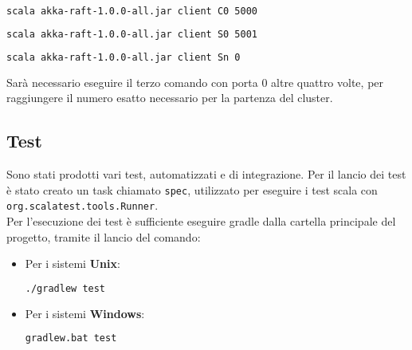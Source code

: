 			  
			  	\begin{lstlisting}[language=bash]
scala akka-raft-1.0.0-all.jar client C0 5000
			  	\end{lstlisting}
			  	\begin{lstlisting}[language=bash]
scala akka-raft-1.0.0-all.jar client S0 5001
					\end{lstlisting}
			  	\begin{lstlisting}[language=bash]
scala akka-raft-1.0.0-all.jar client Sn 0
					\end{lstlisting}			  
		
		Sarà necessario eseguire il terzo comando con porta $0$ altre quattro volte, per raggiungere il numero esatto necessario per la partenza del cluster.
 
 \subsection{Test}
 Sono stati prodotti vari test, automatizzati e di integrazione. Per il lancio dei test è stato creato un task chiamato \texttt{spec}, utilizzato per eseguire i test scala con \texttt{org.scalatest.tools.Runner}.\\
	Per l'esecuzione dei test è sufficiente eseguire gradle dalla cartella principale del progetto, tramite il lancio del comando:
	\begin{itemize}
		\item Per i sistemi \textbf{Unix}: 
			\begin{lstlisting}[language=bash]
./gradlew test
			\end{lstlisting}
		\item Per i sistemi \textbf{Windows}: 
			\begin{lstlisting}[language=bash]
gradlew.bat test
			\end{lstlisting}
	\end{itemize}

